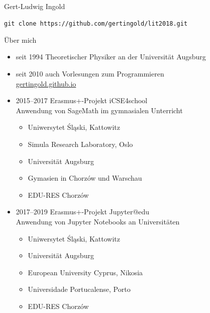 \documentclass[t, utf8, 10pt]{beamer}
\begin{document}
\begin{frame}
 \vspace{4truecm}
 \begin{center}
  \\[0.3truecm]
  {\large Gert-Ludwig Ingold}

  \vspace{2truecm}
  \texttt{\normalsize git clone https://github.com/gertingold/lit2018.git}
 \end{center}
\end{frame}

\begin{frame}{Über mich}
 \begin{itemize}
  \item seit 1994 Theoretischer Physiker an der Universität Augsburg
  \item seit 2010 auch Vorlesungen zum Programmieren\\
	\url{gertingold.github.io}
  \item 2015--2017 Erasmus+-Projekt iCSE4school\quad
        \\
	Anwendung von SageMath im gymnasialen Unterricht
        \begin{itemize}
	 \item Uniwersytet Śląski, Kattowitz
	 \item Simula Research Laboratory, Oslo
	 \item Universität Augsburg
	 \item Gymasien in Chorzów und Warschau
	 \item EDU-RES Chorzów
	\end{itemize}
  \item 2017--2019 Erasmus+-Projekt Jupyter@edu\quad
        \\
	Anwendung von Jupyter Notebooks an Universitäten
        \begin{itemize}
	 \item Uniwersytet Śląski, Kattowitz
	 \item Universität Augsburg
         \item European University Cyprus, Nikosia
	 \item Universidade Portucalense, Porto
	 \item EDU-RES Chorzów
	\end{itemize}
 \end{itemize}
\end{frame}
\end{document}
